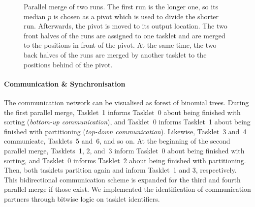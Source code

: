 \begin{figure}

	\caption{
		Parallel merge of two runs.
		The first run is the longer one, so its median \(p\) is chosen as a pivot which is used to divide the shorter run.
		Afterwards, the pivot is moved to its output location.
		The two front halves of the runs are assigned to one tasklet and are merged to the positions in front of the pivot.
		At the same time, the two back halves of the runs are merged by another tasklet to the positions behind of the pivot.
		\cite[Figure~27.6]{cormen2013algorithmen}
	}
	\label{fig:par:merge}
\end{figure}


\paragraph{Communication \& Synchronisation}
The communication network can be visualised as forest of binomial trees.
During the first parallel merge, Tasklet~1 informs Tasklet~0 about being finished with sorting (\emph{bottom-up communication}), and Tasklet~0 informs Tasklet~1 about being finished with partitioning (\emph{top-down communication}).
Likewise, Tasklet~3 and~4 communicate, Tasklets~5 and~6, and so on.
At the beginning of the second parallel merge, Tasklets~1, 2, and~3 inform Tasklet~0 about being finished with sorting, and Tasklet~0 informs Tasklet~2 about being finished with partitioning.
Then, both tasklets partition again and inform Tasklet~1 and 3, respectively.
This bidirectional communication scheme is expanded for the third and fourth parallel merge if those exist.
We implemented the identification of communication partners through bitwise logic on tasklet identifiers.


